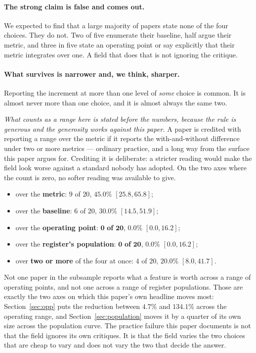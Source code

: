 \documentclass[preprint,12pt]{elsarticle}
\begin{document}
\paragraph{The strong claim is false and comes out.} We expected to find that
a large majority of papers state none of the four choices. They do not. Two of
five enumerate their baseline, half argue their metric, and three in five
state an operating point or say explicitly that their metric integrates over
one. A field that does that is not ignoring the critique.

\paragraph{What survives is narrower and, we think, sharper.} Reporting the
increment at more than one level of \emph{some} choice is common. It is almost
never more than one choice, and it is almost always the same two.

\emph{What counts as a range here is stated before the numbers, because the
rule is generous and the generosity works against this paper.} A paper is
credited with reporting a range over the metric if it reports the
with-and-without difference under two or more metrics --- ordinary practice,
and a long way from the surface this paper argues for. Crediting it is
deliberate: a stricter reading would make the field look worse against a
standard nobody has adopted. On the two axes where the count is zero, no
softer reading was available to give.

\begin{itemize}
\item over the \textbf{metric}: $9$ of $20$, $45.0\%$ $[25.8,65.8]$;
\item over the \textbf{baseline}: $6$ of $20$, $30.0\%$ $[14.5,51.9]$;
\item over the \textbf{operating point}: $\mathbf{0}$ \textbf{of} $\mathbf{20}$, $0.0\%$ $[0.0,16.2]$;
\item over the \textbf{register's population}: $\mathbf{0}$ \textbf{of} $\mathbf{20}$, $0.0\%$ $[0.0,16.2]$;
\item over \textbf{two or more} of the four at once: $4$ of $20$, $20.0\%$ $[8.0,41.7]$.
\end{itemize}

Not one paper in the subsample reports what a feature is worth across a range
of operating points, and not one across a range of register populations.
Those are exactly the two axes on which this paper's own headline moves most:
Section~\ref{sec:opp} puts the reduction between $4.7\%$ and $134.1\%$ across
the operating range, and Section~\ref{sec:population} moves it by a quarter of
its own size across the population curve. The practice failure this paper
documents is not that the field ignores its own critiques. It is that the
field varies the two choices that are cheap to vary and does not vary the two
that decide the answer.
\end{document}
